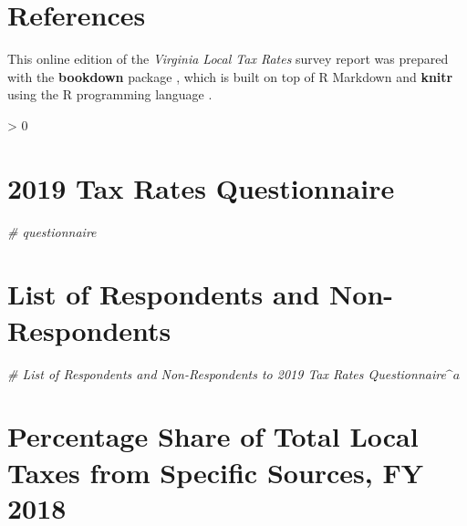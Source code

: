 \documentclass[
]{book}
\newenvironment{Shaded}{\begin{snugshade}}{\end{snugshade}}
\newcommand{\CommentTok}[1]{\textcolor[rgb]{0.56,0.35,0.01}{\textit{#1}}}
\newlength{\cslhangindent}
\newenvironment{CSLReferences}[2] %
 {%
  \setlength{\parindent}{0pt}
  \ifodd #1 \everypar{\setlength{\hangindent}{\cslhangindent}}\ignorespaces\fi
  \ifnum #2 > 0
  \setlength{\parskip}{#2\baselineskip}
  \fi
 }%
 {}
\begin{document}
\hypertarget{references}{%
\chapter*{References}\label{references}}

This online edition of the \emph{Virginia Local Tax Rates} survey report was prepared with the \textbf{bookdown} package \citep{R-bookdown}, which is built on top of R Markdown and \textbf{knitr} \citep{xie2015} using the R programming language \citep{R-base}.

\hypertarget{refs}{}
\begin{CSLReferences}{0}{0}
\end{CSLReferences}

\hypertarget{appendix-appendix}{%
\appendix}


\hypertarget{tax-rates-questionnaire}{%
\chapter{2019 Tax Rates Questionnaire}\label{tax-rates-questionnaire}}

\begin{Shaded}
\begin{Highlighting}[]
\CommentTok{\# questionnaire}
\end{Highlighting}
\end{Shaded}

\hypertarget{list-of-respondents-and-non-respondents}{%
\chapter{List of Respondents and Non-Respondents}\label{list-of-respondents-and-non-respondents}}

\begin{Shaded}
\begin{Highlighting}[]
\CommentTok{\# List of Respondents and Non{-}Respondents to 2019 Tax Rates Questionnaire$\^{}a$}
\end{Highlighting}
\end{Shaded}

\hypertarget{percentage-share-of-total-local-taxes-from-specific-sources-fy-2018}{%
\chapter{Percentage Share of Total Local Taxes from Specific Sources, FY 2018}\label{percentage-share-of-total-local-taxes-from-specific-sources-fy-2018}}
\end{document}
